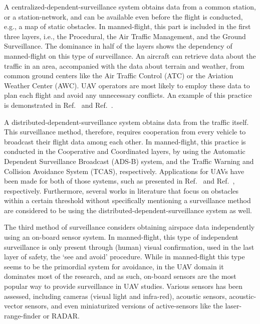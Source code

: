 A centralized-dependent-surveillance system obtains data from a common station, or a station-network, and can be available even before the flight is conducted, e.g., a map of static obstacles. In manned-flight, this part is included in the first three layers, i.e., the Procedural, the Air Traffic Management, and the Ground Surveillance. The dominance in half of the layers shows the dependency of manned-flight on this type of surveillance. An aircraft can retrieve data about the traffic in an area, accompanied with the data about terrain and weather, from common ground centers like the Air Traffic Control (ATC) or the Aviation Weather Center (AWC). UAV operators are most likely to employ these data to plan each flight and avoid any unnecessary conflicts. An example of this practice is demonstrated in Ref.~\cite{Nikolos:03} and Ref.~\cite{Brooker:13}. 

A distributed-dependent-surveillance system obtains data from the traffic itself. This surveillance method, therefore, requires cooperation from every vehicle to broadcast their flight data among each other. In manned-flight, this practice is conducted in the Cooperative and Coordinated layers, by using the Automatic Dependent Surveillance Broadcast (ADS-B)\cite{McCallie:11} system, and the Traffic Warning and Collision Avoidance System (TCAS), respectively.  Applications for UAVs have been made for both of those systems, such as presented in Ref.~\cite{Park:08} and Ref.~\cite{Zeitlin:07}, respectively. Furthermore, several works in literature that focus on obstacles within a certain threshold without specifically mentioning a surveillance method are considered to be using the distributed-dependent-surveillance system as well.

The third method of surveillance considers obtaining airspace data independently using an on-board sensor system. In manned-flight, this type of independent surveillance is only present through (human) visual confirmation, used in the last layer of safety, the `see and avoid' procedure\cite{FAR:91}. While in manned-flight this type seems to be the primordial system for avoidance, in the UAV domain it dominates most of the research, and as such, on-board sensors are the most popular way to provide surveillance in UAV studies. Various sensors has been assessed, including cameras (visual light and infra-red)\cite{Fasano:08}, acoustic sensors\cite{Muller:14}, acoustic-vector sensors\cite{Tijs:10}, and even miniaturized versions of active-sensors like the laser-range-finder\cite{Hrabar:11} or RADAR\cite{Moses:14}. 

